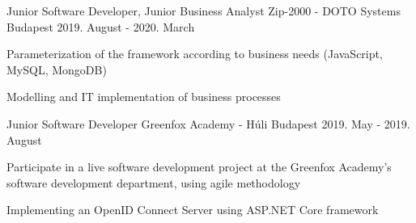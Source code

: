 \begin{cventries}
  \cventry
    {Junior Software Developer, Junior Business Analyst} %
    {Zip-2000 - DOTO Systems} %
    {Budapest} %
    {2019. August - 2020. March} %
    {
      \begin{cvitems} %
        \item {Parameterization of the framework according to business needs (JavaScript, MySQL, MongoDB)}
        \item {Modelling and IT implementation of business processes}
      \end{cvitems}
    }

  \cventry
    {Junior Software Developer} %
    {Greenfox Academy - Húli} %
    {Budapest} %
    {2019. May - 2019. August } %
    {
      \begin{cvitems} %
        \item {Participate in a live software development project at the Greenfox Academy's software development department, using agile methodology}
        \item {Implementing an OpenID Connect Server using ASP.NET Core framework}
      \end{cvitems}
    }  


\end{cventries}
